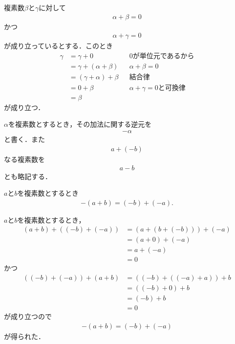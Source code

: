	\begin{sketch}
		複素数$\beta$と$\gamma$に対して
		\begin{align}
			\alpha + \beta = 0
		\end{align}
		かつ
		\begin{align}
			\alpha + \gamma = 0
		\end{align}
		が成り立っているとする．このとき
		\begin{align}
			\gamma &= \gamma + 0 &&\mbox{$0$が単位元であるから} \\
			&= \gamma + (\alpha + \beta) &&\mbox{$\alpha + \beta = 0$} \\
			&= (\gamma + \alpha) + \beta &&\mbox{結合律} \\
			&= 0 + \beta &&\mbox{$\alpha + \gamma = 0$と可換律} \\
			&= \beta
		\end{align}
		が成り立つ．
		\QED
	\end{sketch}
	
	$\alpha$を複素数とするとき，その加法に関する逆元を
	\begin{align}
		- \alpha
	\end{align}
	と書く．また
	\begin{align}
		a + (-b)
	\end{align}
	なる複素数を
	\begin{align}
		a - b
	\end{align}
	とも略記する．
	
	\begin{screen}
		\begin{thm}[和の逆元は逆元の和]
		\label{thm:inverse_of_sum}
			$a$と$b$を複素数とするとき
			\begin{align}
				-(a + b) = (-b) + (-a).
			\end{align}
		\end{thm}
	\end{screen}
	
	\begin{sketch}
		$a$と$b$を複素数とするとき，
		\begin{align}
			(a+b) + ((-b) + (-a))
			&= (a + (b + (-b))) + (-a) \\
			&= (a + 0) + (-a) \\
			&= a + (-a) \\
			&= 0 
		\end{align}
		かつ
		\begin{align}
			((-b) + (-a)) + (a+b)
			&= ((-b) + ((-a) + a)) + b \\
			&= ((-b) + 0) + b \\
			&= (-b) + b \\
			&= 0
		\end{align}
		が成り立つので
		\begin{align}
			-(a + b) = (-b) + (-a)
		\end{align}
		が得られた．
		\QED
	\end{sketch}
	
